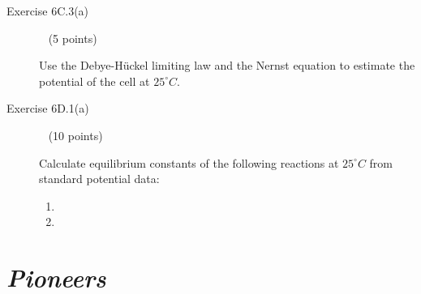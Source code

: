 \documentclass[12pt, openany, letterpaper]{memoir}
\begin{document}
\begin{description}
	\vspace{6em}
	
	\item [Exercise 6C.3(a)] ~ (5 points)
	
	Use the Debye-H\"uckel limiting law and the Nernst equation to estimate the potential of the cell  at $25^\circ C$.
	
	\vspace{25em}
	\item [Exercise 6D.1(a)] ~ (10 points)
	
	Calculate equilibrium constants of the following reactions at $25^\circ C$ from standard potential data:
	\begin{enumerate}
		\item {}
		
		\vspace{10em}
		\item {}
	\end{enumerate}


	
	
	
\end{description}

\newpage
\pagestyle{empty}
\addtocounter{page}{-1}	
\section*{\emph{Pioneers}}
\end{document}
